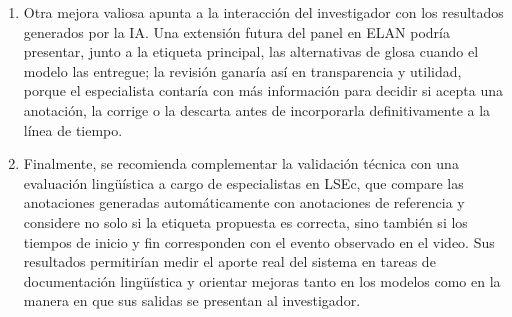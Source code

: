 \begin{enumerate}
    \item Otra mejora valiosa apunta a la interacción del investigador con los resultados generados por la IA. Una extensión futura del panel en ELAN podría presentar, junto a la etiqueta principal, las alternativas de glosa cuando el modelo las entregue; la revisión ganaría así en transparencia y utilidad, porque el especialista contaría con más información para decidir si acepta una anotación, la corrige o la descarta antes de incorporarla definitivamente a la línea de tiempo.

    \item Finalmente, se recomienda complementar la validación técnica con una evaluación lingüística a cargo de especialistas en LSEc, que compare las anotaciones generadas automáticamente con anotaciones de referencia y considere no solo si la etiqueta propuesta es correcta, sino también si los tiempos de inicio y fin corresponden con el evento observado en el video. Sus resultados permitirían medir el aporte real del sistema en tareas de documentación lingüística y orientar mejoras tanto en los modelos como en la manera en que sus salidas se presentan al investigador.
\end{enumerate}
